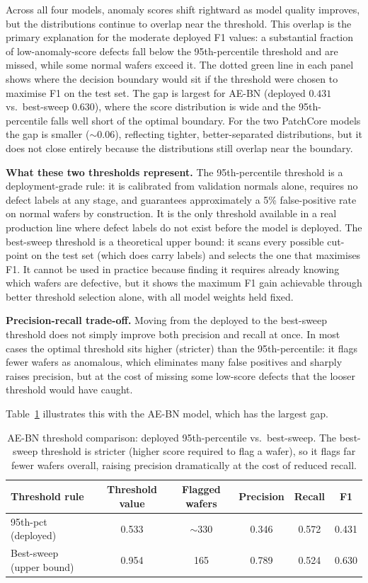 \documentclass[11pt]{article}
\begin{document}
Across all four models, anomaly scores shift rightward as model quality improves, but the distributions continue to overlap near the threshold.
This overlap is the primary explanation for the moderate deployed F1 values: a substantial fraction of low-anomaly-score defects fall below the 95th-percentile threshold and are missed, while some normal wafers exceed it.
The dotted green line in each panel shows where the decision boundary would sit if the threshold were chosen to maximise F1 on the test set.
The gap is largest for AE-BN (deployed $0.431$ vs.\ best-sweep $0.630$), where the score distribution is wide and the 95th-percentile falls well short of the optimal boundary.
For the two PatchCore models the gap is smaller (${\sim}0.06$), reflecting tighter, better-separated distributions, but it does not close entirely because the distributions still overlap near the boundary.

\textbf{What these two thresholds represent.}
The 95th-percentile threshold is a deployment-grade rule: it is calibrated from validation normals alone, requires no defect labels at any stage, and guarantees approximately a 5\% false-positive rate on normal wafers by construction.
It is the only threshold available in a real production line where defect labels do not exist before the model is deployed.
The best-sweep threshold is a theoretical upper bound: it scans every possible cut-point on the test set (which does carry labels) and selects the one that maximises F1.
It cannot be used in practice because finding it requires already knowing which wafers are defective, but it shows the maximum F1 gain achievable through better threshold selection alone, with all model weights held fixed.

\textbf{Precision-recall trade-off.} Moving from the deployed to the best-sweep threshold does not simply improve both precision and recall at once. In most cases the optimal threshold sits higher (stricter) than the 95th-percentile: it flags fewer wafers as anomalous, which eliminates many false positives and sharply raises precision, but at the cost of missing some low-score defects that the looser threshold would have caught.

Table~\ref{tab:threshold_comparison} illustrates this with the AE-BN model, which has the largest gap.

\begin{table}[H]
\centering
\caption{AE-BN threshold comparison: deployed 95th-percentile vs.\ best-sweep.
The best-sweep threshold is stricter (higher score required to flag a wafer),
so it flags far fewer wafers overall, raising precision dramatically at the
cost of reduced recall.}
\label{tab:threshold_comparison}
\begin{tabular}{lccccc}
\toprule
Threshold rule & Threshold value & Flagged wafers & Precision & Recall & F1 \\
\midrule
95th-pct (deployed) & 0.533 & ${\sim}330$ & 0.346 & 0.572 & 0.431 \\
Best-sweep (upper bound) & 0.954 & 165          & 0.789 & 0.524 & 0.630 \\
\bottomrule
\end{tabular}
\end{table}
\end{document}
